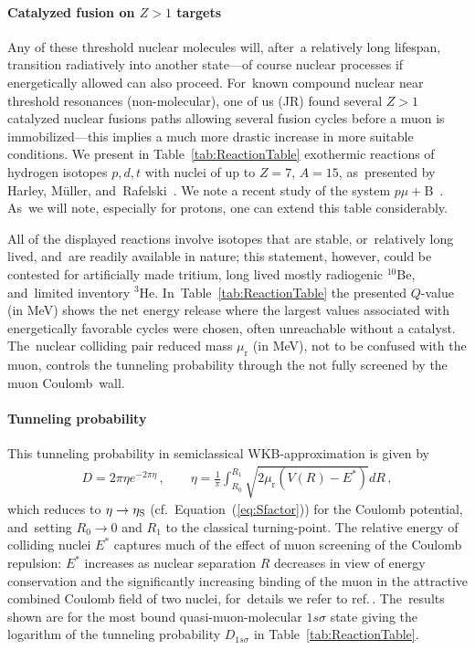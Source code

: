 \documentclass[particles,article,accept,pdftex,moreauthors]{Definitions/mdpi}
\newcommand*{\xblue}{}
\begin{document}
\vspace{-6pt}\paragraph*{\bf Catalyzed fusion on $Z>1$ targets}
Any of these threshold nuclear molecules will, after~a relatively long lifespan, transition radiatively into another state---of course nuclear processes if energetically allowed can also proceed. For~known compound nuclear near threshold resonances (non-molecular), one of us (JR) found several $Z>1$ catalyzed nuclear fusions paths allowing several fusion cycles before a muon is immobilized---this implies a much more drastic increase in more suitable conditions. We present in Table~\ref{tab:ReactionTable} exothermic reactions of hydrogen isotopes $p,d,t$ with nuclei of up to $Z = 7$, $A = 15$, as~presented by Harley, M{\"u}ller, and~Rafelski~\cite{Harley:1988wp}. {\xblue We note a recent study of the system $p\mu+\mathrm{B}$~\cite{Wang:2026zuj}. As~we will note, especially for protons, one can extend this table considerably.}



All of the displayed reactions involve isotopes that are stable, or~relatively long lived, and~are readily available in nature; this statement, however, could be contested for artificially made tritium, long lived mostly radiogenic ${}^{10}\mathrm{Be}$, and~limited inventory ${}^3\mathrm{He}$. In~Table~\ref{tab:ReactionTable} the presented $Q$-value (in MeV) shows the net energy release where the largest values associated with energetically favorable cycles were chosen, often unreachable without a catalyst. The~nuclear colliding pair reduced mass $\mu_\mathrm{r}$ (in MeV), not to be confused with the muon, controls the tunneling probability through the not fully screened by the muon Coulomb~wall.

\vspace{-6pt}\paragraph*{\bf Tunneling probability}
This tunneling probability in semiclassical WKB-approximation is given by
\begin{align}
D=2\pi\eta e^{-2\pi\eta}\,,\qquad \eta=\frac{1}{\pi}\int_{R_0}^{R_1}\sqrt{2\mu_\mathrm{r}(V(R)-E^*)}dR\,,
\end{align}
{\xblue which reduces to $\eta\to\eta_{\rm S}$ (cf.~Equation~(\ref{eq:Sfactor})) for the Coulomb potential, and~setting $R_0\to0$ and $R_1$ to the classical turning-point.} The relative energy of colliding nuclei $E^*$ captures much of the effect of muon screening of the Coulomb repulsion: $E^*$ increases as nuclear separation $R$ decreases in view of energy conservation and the significantly increasing binding of the muon in the attractive combined Coulomb field of two nuclei, for~details we refer to ref.\,\cite{Harley:1988wp}. The~results shown are for the most bound quasi-muon-molecular $1s\sigma$ state giving the logarithm of the tunneling probability $D_{1s\sigma}$ in Table~\ref{tab:ReactionTable}. 
\end{document}
